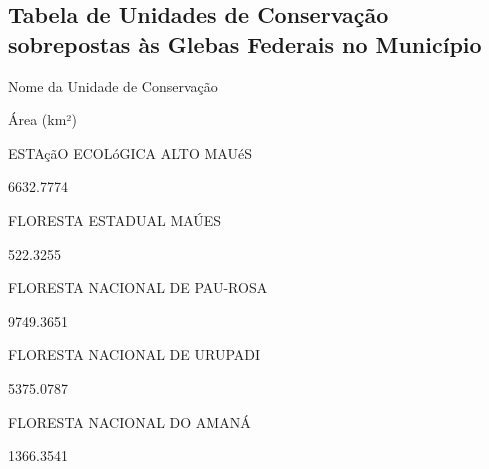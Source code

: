 \documentclass[
  letterpaper,
]{report}
\begin{document}
\hypertarget{tabela-de-unidades-de-conservauxe7uxe3o-sobrepostas-uxe0s-glebas-federais-no-municuxedpio}{%
\subsection{Tabela de Unidades de Conservação sobrepostas às Glebas
Federais no
Município}\label{tabela-de-unidades-de-conservauxe7uxe3o-sobrepostas-uxe0s-glebas-federais-no-municuxedpio}}

\n  

\n    

\n      

Nome da Unidade de Conservação

\n      

Área (km²)

\n    

\n  

\n  

\n    

\n      

ESTAçãO ECOLóGICA ALTO MAUéS

\n      

6632.7774

\n    

\n    

\n      

FLORESTA ESTADUAL MAÚES

\n      

522.3255

\n    

\n    

\n      

FLORESTA NACIONAL DE PAU-ROSA

\n      

9749.3651

\n    

\n    

\n      

FLORESTA NACIONAL DE URUPADI

\n      

5375.0787

\n    

\n    

\n      

FLORESTA NACIONAL DO AMANÁ

\n      

1366.3541

\n    

\n    

\n      
\end{document}

